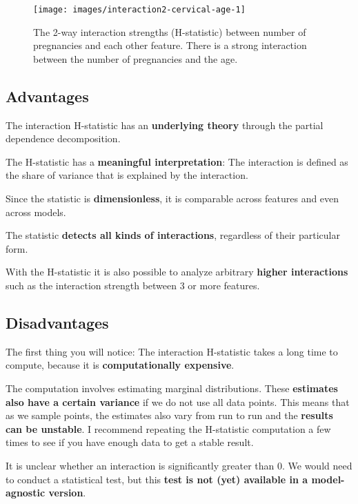 \documentclass[12pt,]{krantz}
\begin{document}
\begin{figure}

{\centering \texttt{[image: images/interaction2-cervical-age-1]} 

}

\caption{The 2-way interaction strengths (H-statistic) between number of pregnancies and each other feature. There is a strong interaction between the number of pregnancies and the age.}\label{fig:interaction2-cervical-age-include}
\end{figure}

\subsection{Advantages}\label{advantages-7}

The interaction H-statistic has an \textbf{underlying theory} through
the partial dependence decomposition.

The H-statistic has a \textbf{meaningful interpretation}: The
interaction is defined as the share of variance that is explained by the
interaction.

Since the statistic is \textbf{dimensionless}, it is comparable across
features and even across models.

The statistic \textbf{detects all kinds of interactions}, regardless of
their particular form.

With the H-statistic it is also possible to analyze arbitrary
\textbf{higher interactions} such as the interaction strength between 3
or more features.

\subsection{Disadvantages}\label{disadvantages-7}

The first thing you will notice: The interaction H-statistic takes a
long time to compute, because it is \textbf{computationally expensive}.

The computation involves estimating marginal distributions. These
\textbf{estimates also have a certain variance} if we do not use all
data points. This means that as we sample points, the estimates also
vary from run to run and the \textbf{results can be unstable}. I
recommend repeating the H-statistic computation a few times to see if
you have enough data to get a stable result.

It is unclear whether an interaction is significantly greater than 0. We
would need to conduct a statistical test, but this \textbf{test is not
(yet) available in a model-agnostic version}.
\end{document}
